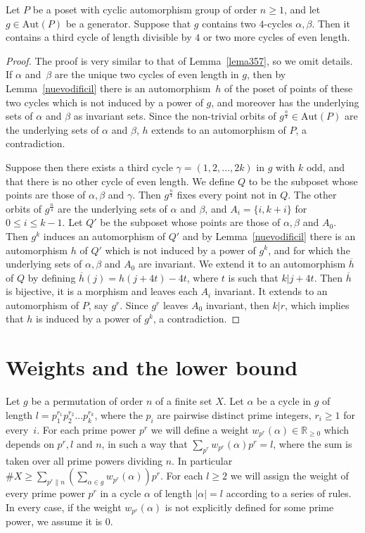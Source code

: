 \documentclass[ALCO,published]{cedram}
\renewcommand{\sigma}{g}
\renewcommand{\varphi}{h}
\newcommand{\R}{\mathbb{R}}
\newcommand{\aut}{\textrm{Aut}}
\begin{document}
\begin{lema} \label{lema4}
Let $P$ be a poset with cyclic automorphism group of order $n\ge 1$, and let $g\in \aut (P)$ be a generator. Suppose that $g$ contains two $4$-cycles $\alpha, \beta$. Then it contains a third cycle of length divisible by $4$ or two more cycles of even length. 
\end{lema}
\begin{proof}
The proof is very similar to that of Lemma~\ref{lema357}, so we omit details. If $\alpha$ and~$\beta$ are the unique two cycles of even length in $g$, then by Lemma~\ref{nuevodificil} there is an automorphism~$h$ of the poset of points of these two cycles which is not induced by a power of $g$, and moreover has the underlying sets of $\alpha$ and $\beta$ as invariant sets. Since the non-trivial orbits of $g^{\frac{n}{4}}\in \aut(P)$ are the underlying sets of $\alpha$ and $\beta$, $h$ extends to an automorphism of $P$, a contradiction.  

Suppose then there exists a third cycle $\gamma=(1,2,\ldots, 2k)$ in $g$ with $k$ odd, and that there is no other cycle of even length. We define $Q$ to be the subposet whose points are those of $\alpha, \beta$ and $\gamma$. Then $g^{\frac{n}{4}}$ fixes every point not in $Q$. The other orbits of $g^{\frac{n}{4}}$ are the underlying sets of $\alpha$ and $\beta$, and $A_i=\{i,k+i\}$ for $0\le i\le k-1$. Let $Q'$ be the subposet whose points are those of $\alpha, \beta$ and $A_0$. Then $g^k$ induces an automorphism of $Q'$ and by Lemma~\ref{nuevodificil} there is an automorphism $\varphi$ of $Q'$ which is not induced by a power of $g^k$, and for which the underlying sets of $\alpha, \beta$ and $A_0$ are invariant. We extend it to an automorphism $\overline{\varphi}$ of $Q$ by defining $\overline{\varphi}(j)=\varphi(j+4t)-4t$, where $t$ is such that $k|j+4t$. Then $\overline{\varphi}$ is bijective, it is a morphism and leaves each $A_i$ invariant. It extends to an automorphism of $P$, say $g^r$. Since $g^r$ leaves $A_0$ invariant, then $k|r$, which implies that $h$ is induced by a power of $g^k$, a contradiction.
\end{proof}

\section{Weights and the lower bound}  \label{sectionweights}

Let $\sigma$ be a permutation of order $n$ of a finite set $X$. Let $\alpha$ be a cycle in $\sigma$ of length $l=p_1^{r_1}p_2^{r_2}\ldots p_k^{r_k}$, where the $p_i$ are pairwise distinct prime integers, $r_i\ge 1$ for every~$i$. For each prime power $p^r$ we will define a weight $w_{p^r}(\alpha)\in \R_{\ge 0}$ which depends on $p^r,l$ and $n$, in such a way that $\sum\limits_{p^r} w_{p^r}(\alpha)p^r= l$, where the sum is taken over all prime powers dividing $n$. In particular $\# X\ge \sum\limits_{p^r\parallel n} (\sum\limits_{\alpha \in \sigma} w_{p^r}(\alpha))p^r$. For each $l\ge 2$ we will assign the weight of every prime power $p^r$ in a cycle $\alpha$ of length $|\alpha|=l$ according to a series of rules. In every case, if the weight $w_{p^r}(\alpha)$ is not explicitly defined for some prime power, we assume it is $0$.  
\end{document}
